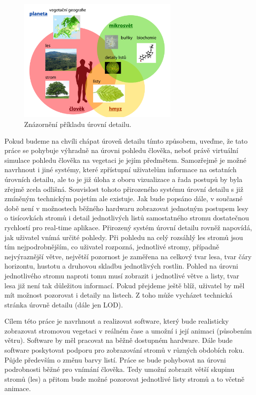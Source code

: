 \begin{figure}[!hbt]
\begin{center}
\includegraphics[width=0.7\textwidth]{./figures/DETAIL.png}

\caption{Znázornění příkladu úrovní detailu. }
\label{fig:Levels_of_detail}
\end{center}
\end{figure}

Pokud budeme na chvíli chápat úroveň detailu tímto způsobem, uveďme, že tato práce se pohybuje výhradně na úrovni pohledu člověka, neboť právě virtuální simulace pohledu člověka na vegetaci je jejím předmětem.
Samozřejmě je možné navrhnout i jiné systémy, které zpřístupní uživatelům informace na ostatních úrovních detailu, ale to je již úloha z oboru vizualizace a řada postupů by byla zřejmě zcela odlišná.
Souvislost tohoto přirozeného systému úrovní detailu s již zmíněným technickým pojetím ale existuje. Jak bude popsáno dále, v současné době není v možnostech běžného hardwaru zobrazovat jednotným postupem lesy o tisícovkách stromů i detail jednotlivých listů samostatného stromu dostatečnou rychlostí pro real-time aplikace. Přirozený systém úrovní detailu rovněž napovídá, jak uživatel vnímá určité pohledy. Při pohledu na celý rozsáhlý les stromů jsou tím nejpodrobnějším, co uživatel rozpozná, jednotlivé stromy, případně nejvýraznější větve, největší pozornost je zaměřena na celkový tvar lesa, tvar čáry horizontu, hustotu a druhovou skladbu jednotlivých rostlin. Pohled na úrovni jednotlivého stromu naproti tomu musí zobrazit i jednotlivé větve a listy, tvar lesa již není tak důležitou informací. Pokud přejdeme ještě blíž, uživatel by měl mít možnost pozorovat i detaily na listech. Z toho může vycházet technická stránka úrovně detailu (dále jen LOD).

Cílem této práce je navrhnout a realizovat software, který bude realisticky zobrazovat stromovou vegetaci v reálném čase a umožní i její animaci (působením větru). Software by měl pracovat na běžně dostupném hardware. Dále bude software poskytovat podporu pro zobrazování stromů v různých obdobích roku. Půjde především o změnu barvy listí. Práce se bude pohybovat na úrovni podrobnosti běžné pro vnímání člověka. Tedy umožní zobrazit větší skupinu stromů (les) a přitom bude možné pozorovat jednotlivé listy stromů a to včetně animace.

